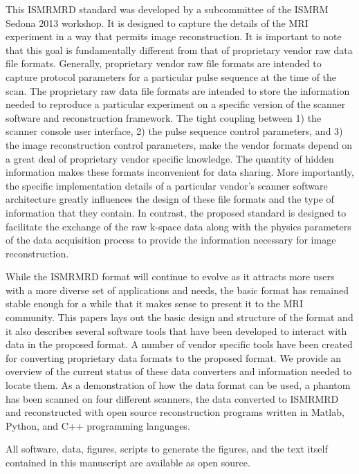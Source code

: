 \documentclass[12pt]{article}
\begin{document}
This ISMRMRD standard was developed by a subcommittee of the ISMRM Sedona 2013 workshop.  It is designed to capture the details of the MRI experiment in a way that permits image reconstruction.  It is important to note that this goal is fundamentally different from that of proprietary vendor raw data file formats.  Generally, proprietary vendor raw file formats are intended to capture protocol parameters for a particular pulse sequence at the time of the scan.  The proprietary raw data file formats are intended to store the information needed to reproduce a particular experiment on a specific version of the scanner software and reconstruction framework.  The tight coupling between 1) the scanner console user interface, 2) the pulse sequence control parameters, and 3) the image reconstruction control parameters, make the vendor formats depend on a great deal of proprietary vendor specific knowledge. The quantity of hidden information makes these formats inconvenient for data sharing.  More importantly, the specific implementation details of a particular vendor's scanner software architecture greatly influences the design of these file formats and the type of information that they contain.  In contrast, the proposed standard is designed to facilitate the exchange of the raw k-space data along with the physics parameters of the data acquisition process to provide the information necessary for image reconstruction.

While the ISMRMRD format will continue to evolve as it attracts more users with a more diverse set of applications and needs, the basic format has remained stable enough for a while that it makes sense to present it to the MRI community. This papers lays out the basic design and structure of the format and it also describes several software tools that have been developed to interact with data in the proposed format. A number of vendor specific tools have been created for converting proprietary data formats to the proposed format. We provide an overview of the current status of these data converters and information needed to locate them. As a demonstration of how the data format can be used, a phantom has been scanned on four different scanners, the data converted to ISMRMRD and reconstructed with open source reconstruction programs written in Matlab, Python, and C++ programming languages. 

All software, data, figures, scripts to generate the figures, and the text itself contained in this manuscript are available as open source. 
\end{document}
